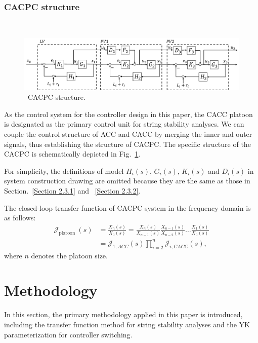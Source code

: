 \documentclass[journal]{IEEEtran}
\begin{document}
\subsubsection{CACPC structure}
\label{Section 2.3.3}
~\\
\begin{figure}
  \centering
  \includegraphics[width=14cm]{figs/fig3.png}
  \caption{~CACPC structure.}
  \label{fig3}
\end{figure}

As the control system for the controller design in this paper, the CACC platoon is designated as the primary control unit for string stability analyses. We can couple the control structure of ACC and CACC by merging the inner and outer signals, thus establishing the structure of CACPC. The specific structure of the CACPC is schematically depicted in Fig.~\ref{fig3}.

For simplicity, the definitions of model $H_i(s)$, $G_i(s)$, $K_i(s)$ and $D_i(s)$ in system construction drawing are omitted because they are the same as those in Section.~\ref{Section 2.3.1} and ~\ref{Section 2.3.2}.

The closed-loop transfer function of CACPC system in the frequency domain is as follows:
\begin{equation}
  \begin{aligned}
    \mathcal{J}_{\text {platoon }}(s)
     & =\frac{X_{n}(s)}{X_{0}(s)}=\frac{X_{n}(s)}{X_{n-1}(s)} \frac{X_{n-1}(s)}{X_{n-2}(s)} \ldots \frac{X_{1}(s)}{X_{0}(s)} \\
     & =\mathcal{J}_{1, A C C}(s) \prod_{i=2}^{n} \mathcal{J}_{i, C A C C}(s),
  \end{aligned}
  \label{Eq8}
\end{equation}
where $n$ denotes the platoon size.

\section{Methodology}
\label{Section 3}
In this section, the primary methodology applied in this paper is introduced, including the transfer function method for string stability analyses and the YK parameterization for controller switching.
\end{document}
